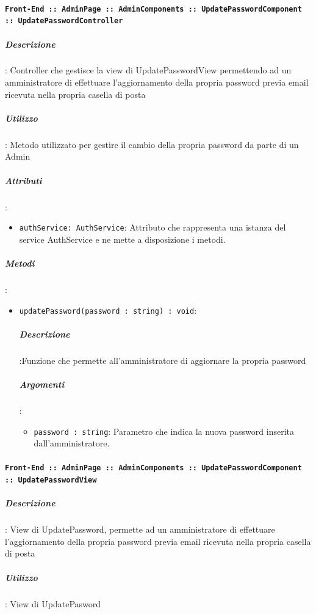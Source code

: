 \documentclass[../DefinizioneDiProdotto_v2.0.0.tex]{subfiles}
\begin{document}
				\paragraph{\texttt{Front-End :: AdminPage :: AdminComponents :: UpdatePasswordComponent :: UpdatePasswordController}}
					\subparagraph{Descrizione}: Controller che gestisce la view di UpdatePasswordView permettendo ad un amministratore di effettuare l'aggiornamento della propria password previa email ricevuta nella propria casella di posta
					\subparagraph{Utilizzo}: Metodo utilizzato per gestire il cambio della propria password da parte di un Admin
					\subparagraph{Attributi}:
					\begin{itemize}
						\item \texttt{authService: AuthService}: Attributo che rappresenta una istanza del service AuthService e ne mette a disposizione i metodi.
					\end{itemize}
					\subparagraph{Metodi}:
					\begin{itemize}
						\item \texttt{updatePassword(password : string) : void}:
						\subparagraph{Descrizione}:Funzione che permette all'amministratore di aggiornare la propria password
						\subparagraph{Argomenti}:
					  	\begin{itemize}
					  		\item \texttt{password : string}: Parametro che indica la nuova password inserita dall'amministratore.
					  	\end{itemize}
					\end{itemize}\vspace{0.5em}
				\paragraph{\texttt{Front-End :: AdminPage :: AdminComponents :: UpdatePasswordComponent :: UpdatePasswordView}}

		      		\subparagraph{Descrizione}: View di UpdatePassword, permette ad un amministratore di effettuare l'aggiornamento della propria password previa email ricevuta nella propria casella di posta
			      	\subparagraph{Utilizzo}: View di UpdatePasword


	\newpage
\end{document}
